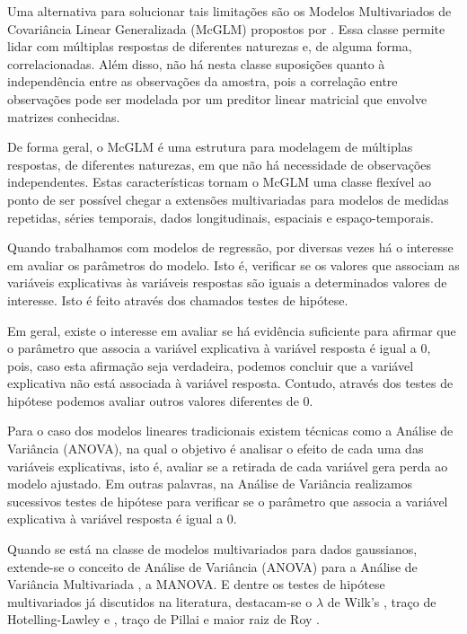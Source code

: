 Uma alternativa para solucionar tais limitações são os Modelos Multivariados de Covariância Linear Generalizada (McGLM) propostos por \citet{Bonat16}. Essa classe permite lidar com múltiplas respostas de diferentes naturezas e, de alguma forma, correlacionadas. Além disso, não há nesta classe suposições quanto à independência entre as observações da amostra, pois a correlação entre observações pode ser modelada por um preditor linear matricial que envolve matrizes conhecidas. 

De forma geral, o McGLM é uma estrutura para modelagem de múltiplas respostas, de diferentes naturezas, em que não há necessidade de observações independentes. Estas características tornam o McGLM uma classe flexível ao ponto de ser possível chegar a extensões multivariadas para modelos de medidas repetidas, séries temporais, dados longitudinais, espaciais e espaço-temporais.

Quando trabalhamos com modelos de regressão, por diversas vezes há o interesse em avaliar os parâmetros do modelo. Isto é, verificar se os valores que associam as variáveis explicativas às variáveis respostas são iguais a determinados valores de interesse. Isto é feito através dos chamados testes de hipótese. 

Em geral, existe o interesse em avaliar se há evidência suficiente para afirmar que o parâmetro que associa a variável explicativa à variável resposta é igual a 0, pois, caso esta afirmação seja verdadeira, podemos concluir que a variável explicativa não está associada à variável resposta. Contudo, através dos testes de hipótese podemos avaliar outros valores diferentes de 0.

Para o caso dos modelos lineares tradicionais existem técnicas como a Análise de Variância (ANOVA), na qual o objetivo é analisar o efeito de cada uma das variáveis explicativas, isto é, avaliar se a retirada de cada variável gera perda ao modelo ajustado. Em outras palavras, na Análise de Variância realizamos sucessivos testes de hipótese para verificar se o parâmetro que associa a variável explicativa à variável resposta é igual a 0.

Quando se está na classe de modelos multivariados para dados gaussianos, extende-se o conceito de Análise de Variância (ANOVA) para a Análise de Variância  Multivariada \citep{manova}, a MANOVA. E dentre os testes de hipótese multivariados já discutidos na literatura, destacam-se o $\lambda$ de Wilk's \citep{wilks}, traço de Hotelling-Lawley \citep{lawley} e \citep{hotelling}, traço de Pillai \citep{pillai} e maior raiz de Roy \citep{roy}.

